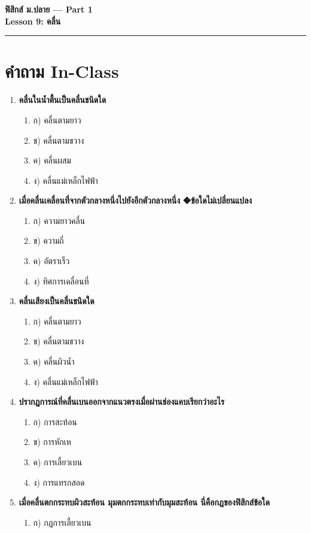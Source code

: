 \documentclass[12pt]{article}
\begin{document}
\begin{center}
{\LARGE\textbf{ฟิสิกส์ ม.ปลาย — Part 1}}\\[0.3em]
{\Large\textbf{Lesson 9: คลื่น}}\\[0.5em]
\rule{0.8\linewidth}{0.5pt}
\end{center}
\section*{คำถาม In-Class}
\begin{enumerate}
\item \textbf{คลื่นในน้ำตื้นเป็นคลื่นชนิดใด}
\begin{enumerate}
\item ก) คลื่นตามยาว
\item ข) คลื่นตามขวาง
\item ค) คลื่นผสม
\item ง) คลื่นแม่เหล็กไฟฟ้า
\end{enumerate}
\item \textbf{เมื่อคลื่นเคลื่อนที่จากตัวกลางหนึ่งไปยังอีกตัวกลางหนึ่ง �ข้อใดไม่เปลี่ยนแปลง}
\begin{enumerate}
\item ก) ความยาวคลื่น
\item ข) ความถี่
\item ค) อัตราเร็ว
\item ง) ทิศการเคลื่อนที่
\end{enumerate}
\item \textbf{คลื่นเสียงเป็นคลื่นชนิดใด}
\begin{enumerate}
\item ก) คลื่นตามยาว
\item ข) คลื่นตามขวาง
\item ค) คลื่นผิวน้ำ
\item ง) คลื่นแม่เหล็กไฟฟ้า
\end{enumerate}
\item \textbf{ปรากฏการณ์ที่คลื่นเบนออกจากแนวตรงเมื่อผ่านช่องแคบเรียกว่าอะไร}
\begin{enumerate}
\item ก) การสะท้อน
\item ข) การหักเห
\item ค) การเลี้ยวเบน
\item ง) การแทรกสอด
\end{enumerate}
\item \textbf{เมื่อคลื่นตกกระทบผิวสะท้อน มุมตกกระทบเท่ากับมุมสะท้อน นี่คือกฎของฟิสิกส์ข้อใด}
\begin{enumerate}
\item ก) กฎการเลี้ยวเบน

\end{enumerate}
\end{enumerate}
\end{document}
